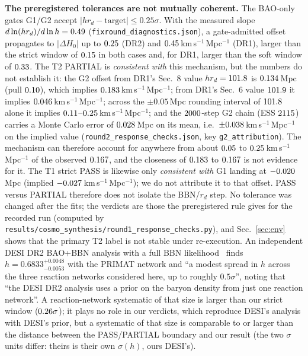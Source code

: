 \documentclass[11pt]{article}
\newcommand{\kms}{km\,s$^{-1}$\,Mpc$^{-1}$}
\begin{document}
\textbf{The preregistered tolerances are not mutually coherent.} The BAO-only gates G1/G2 accept $|hr_d-\text{target}|\le0.25\sigma$. With the
measured slope $d\ln(hr_d)/d\ln h=0.49$ (\texttt{fixround\_diagnostics.json}), a gate-admitted offset propagates to $|\Delta H_0|$ up to
$0.25$ (DR2) and $0.45$\,\kms{} (DR1), larger than the strict window of $0.15$ in both cases and, for DR1, larger than the soft
window of $0.33$. The T2 PARTIAL is \emph{consistent with} this mechanism, but the numbers do not establish it: the G2 offset
from DR1's Sec.~8 value $hr_d=101.8$ is $0.134$\,Mpc (pull $0.10$), which implies $0.183$\,\kms{}; from DR1's Sec.~6 value $101.9$
it implies $0.046$\,\kms; across the $\pm0.05$\,Mpc rounding interval of $101.8$ alone it implies $0.11$--$0.25$\,\kms; and the
$2000$-step G2 chain (ESS $2115$) carries a Monte Carlo error of $0.028$\,Mpc on its mean, i.e.\ $\pm0.038$\,\kms{} on the implied value
(\texttt{round2\_response\_checks.json}, key \texttt{g2\_attribution}). The mechanism can therefore account for anywhere from about $0.05$ to $0.25$\,\kms{} of the observed
$0.167$, and the closeness of $0.183$ to $0.167$ is not evidence for it. The T1 strict PASS is likewise only \emph{consistent with} G1 landing at $-0.020$\,Mpc (implied $-0.027$\,\kms); we do not attribute it to that offset. PASS versus
PARTIAL therefore does not isolate the BBN/$r_d$ step. No tolerance was changed after the fits; the verdicts are those the preregistered rule gives for the recorded
run (computed by \texttt{results/cosmo\_synthesis/round1\_response\_checks.py}), and Sec.~\ref{sec:env} shows that the primary T2 label is not stable under
re-execution. An independent DESI DR2 BAO+BBN analysis with a full BBN likelihood~\cite{akharman2026} finds $h=0.6833^{+0.0048}_{-0.0053}$ with the PRIMAT network and
``a modest spread in $h$ across the three reaction networks considered here, up to roughly $0.5\sigma$'', noting that ``the DESI DR2 analysis uses a prior on the
baryon density from just one reaction network''. A reaction-network systematic of that size is larger than our strict window ($0.26\sigma$); it plays no
role in our verdicts, which reproduce DESI's analysis with DESI's prior, but a systematic of that size is comparable to or larger than the distance between the PASS/PARTIAL boundary and our result (the two $\sigma$ units differ: theirs is their own $\sigma(h)$, ours DESI's).
\end{document}
